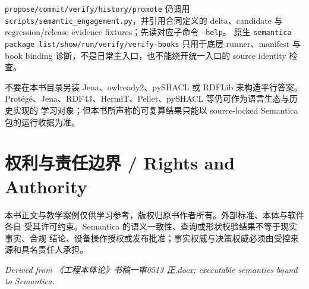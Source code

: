 \begin{codebox}
\end{codebox}
\color{black}

\texttt{propose/commit/verify/history/promote} 仍调用 \texttt{scripts/semantic\_engagement.py}，并引用合同定义的
delta、candidate 与 regression/release evidence fixtures；先读对应子命令 \texttt{--help}。
原生 \texttt{semantica package list/show/run/verify/verify-books} 只用于底层 runner、manifest 与
book binding 诊断，不是日常主入口，也不能绕开统一入口的 source identity 检查。

不要在本书目录另装 Jena、owlready2、pySHACL 或 RDFLib 来构造平行答案。
Protégé、Jena、RDF4J、HermiT、Pellet、pySHACL 等仍可作为语言生态与历史实现的
学习对象；但本书所声称的可复算结果只能以 source-locked Semantica 包的运行收据为准。

\section*{权利与责任边界 / Rights and Authority}

本书正文与教学案例仅供学习参考，版权归原书作者所有。外部标准、本体与软件各自
受其许可约束。Semantica 的语义一致性、查询或形状校验结果不等于现实事实、合规
结论、设备操作授权或发布批准；事实权威与决策权威必须由受控来源和具名责任人承担。

\textit{Derived from 《工程本体论》书稿一审0513 正.docx; executable semantics bound to Semantica.}
